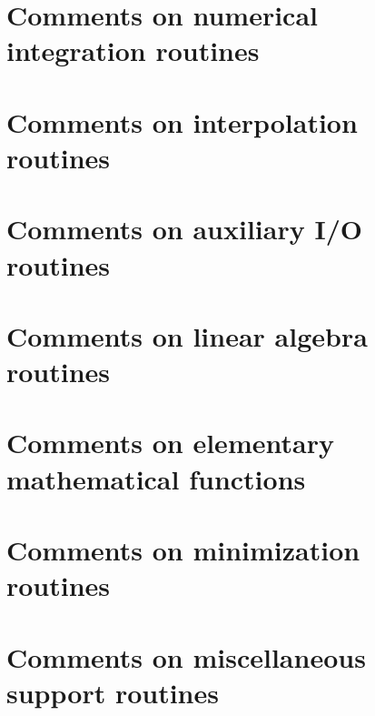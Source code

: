 \documentclass[twoside]{book}
\begin{document}
\chapter{Comments on numerical integration routines}
\label{Comments_01on_01numerical_01integration_01routines}
\hypertarget{Comments_01on_01numerical_01integration_01routines}{}

\chapter{Comments on interpolation routines}
\label{Comments_01on_01interpolation_01routines}
\hypertarget{Comments_01on_01interpolation_01routines}{}

\chapter{Comments on auxiliary I/\-O routines}
\label{Comments_01on_01auxiliary_01I_2O_01routines}
\hypertarget{Comments_01on_01auxiliary_01I_2O_01routines}{}

\chapter{Comments on linear algebra routines}
\label{Comments_01on_01linear_01algebra_01routines}
\hypertarget{Comments_01on_01linear_01algebra_01routines}{}

\chapter{Comments on elementary mathematical functions}
\label{Comments_01on_01elementary_01mathematical_01functions}
\hypertarget{Comments_01on_01elementary_01mathematical_01functions}{}

\chapter{Comments on minimization routines}
\label{Comments_01on_01minimization_01routines}
\hypertarget{Comments_01on_01minimization_01routines}{}

\chapter{Comments on miscellaneous support routines}
\label{Comments_01on_01miscellaneous_01support_01routines}
\hypertarget{Comments_01on_01miscellaneous_01support_01routines}{}

\end{document}
